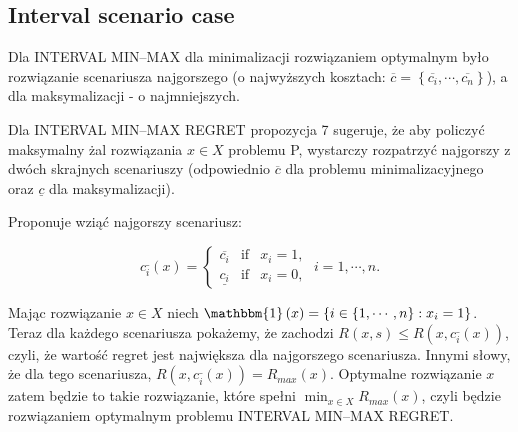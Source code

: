 \subsection{Interval scenario case}

Dla INTERVAL MIN–MAX dla minimalizacji rozwiązaniem optymalnym było rozwiązanie scenariusza najgorszego (o najwyższych kosztach: $\overline{c} = \left\{ \overline{c_{i}}, \cdots, \overline{c_{n}}\right\}$), a dla maksymalizacji - o najmniejszych.

Dla INTERVAL MIN–MAX REGRET propozycja 7 sugeruje, że aby policzyć maksymalny żal rozwiązania $x \in X$ problemu P, wystarczy rozpatrzyć najgorszy z dwóch skrajnych scenariuszy (odpowiednio $\overline{c}$ dla problemu minimalizacyjnego oraz $\underline{c}$ dla maksymalizacji).

Proponuje wziąć najgorszy scenariusz:

\begin{equation}
	c_{i}^{\_} \left( x \right) =
	\left\{\begin{matrix}
		\overline{c_{i}}	&	\textrm{if}	&	x_{i} = 1, \\ 
		\underline{c_{i}}	&	\textrm{if}	&	x_{i} = 0,
	\end{matrix}\right.
	\; i = 1, \cdots, n.
\end{equation}

Mając rozwiązanie $x \in X$ niech $\mathbbm{1} \left( x \right) = \left\{ i \in \left\{ 1, \cdots, n \right\} : x_{i} = 1 \right\}$. Teraz dla każdego scenariusza pokażemy, że zachodzi $R \left( x, s \right) \leqslant R \left( x, c_{i}^{\_} \left( x \right) \right)$, czyli, że wartość regret jest największa dla najgorszego scenariusza. Innymi słowy, że dla tego scenariusza, $R \left( x, c_{i}^{\_} \left( x \right) \right) = R_{max} \left( x \right)$. Optymalne rozwiązanie $x$ zatem będzie to takie rozwiązanie, które spełni $\min_{x \in X} R_{max} \left( x \right)$, czyli będzie rozwiązaniem optymalnym problemu INTERVAL MIN–MAX REGRET.

